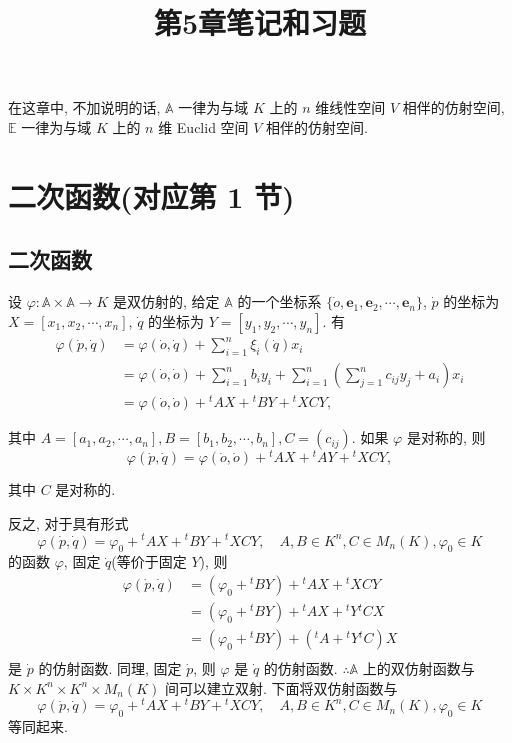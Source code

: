 \documentclass[color=black,device=normal,lang=cn,mode=geye]{elegantnote}
\title{第5章笔记和习题}
\begin{document}
\maketitle
在这章中, 不加说明的话, $\mathbb{A}$ 一律为与域 $K$ 上的 $n$ 维线性空间 $V$ 相伴的仿射空间, $\mathbb{E}$ 一律为与域 $K$ 上的 $n$ 维 Euclid 空间 $V$ 相伴的仿射空间.
\section{二次函数(对应第 1 节)}
\subsection{二次函数}
设 $\varphi:\mathbb{A}\times\mathbb{A}\to K$ 是双仿射的, 给定 $\mathbb{A}$ 的一个坐标系 $\{\dot{o},\boldsymbol{e}_1,\boldsymbol{e}_2,\cdots,\boldsymbol{e}_n\}$, $\dot{p}$ 的坐标为 $X=[x_1,x_2,\cdots,x_n]$, $\dot{q}$ 的坐标为 $Y=[y_1,y_2,\cdots,y_n]$. 有
\begin{align*}
    \varphi(\dot{p},\dot{q}) & =\varphi(\dot{o},\dot{q})+\sum\limits_{i=1}^n\xi_i(\dot{q})x_i \\
    & =\varphi(\dot{o},\dot{o})+\sum\limits_{i=1}^nb_iy_i+\sum\limits_{i=1}^n\left(\sum\limits_{j=1}^nc_{ij}y_j+a_i\right)x_i \\
    & =\varphi(\dot{o},\dot{o})+{}^tAX+{}^tBY+{}^tXCY,
\end{align*}

其中 $A=[a_1,a_2,\cdots,a_n],B=[b_1,b_2,\cdots,b_n],C=(c_{ij})$. 如果 $\varphi$ 是对称的, 则
\[\varphi(\dot{p},\dot{q})=\varphi(\dot{o},\dot{o})+{}^tAX+{}^tAY+{}^tXCY,\]

其中 $C$ 是对称的.

反之, 对于具有形式
\[\varphi(\dot{p},\dot{q})=\varphi_0+{}^tAX+{}^tBY+{}^tXCY,\quad A,B\in K^n,C\in M_n(K),\varphi_0\in K\]
的函数 $\varphi$, 固定 $\dot{q}$(等价于固定 $Y$), 则
\begin{align*}
    \varphi(\dot{p},\dot{q}) & =(\varphi_0+{}^tBY)+{}^tAX+{}^tXCY \\
    & =(\varphi_0+{}^tBY)+{}^tAX+{}^tY{}^tCX \\
    & =(\varphi_0+{}^tBY)+({}^tA+{}^tY{}^tC)X \\
\end{align*}
是 $\dot{p}$ 的仿射函数. 同理, 固定 $\dot{p}$, 则 $\varphi$ 是 $\dot{q}$ 的仿射函数. $\therefore\mathbb{A}$ 上的双仿射函数与 $K\times K^n\times K^n\times M_n(K)$ 间可以建立双射. 下面将双仿射函数与
\[\varphi(\dot{p},\dot{q})=\varphi_0+{}^tAX+{}^tBY+{}^tXCY,\quad A,B\in K^n,C\in M_n(K),\varphi_0\in K\]
等同起来.
\end{document}
